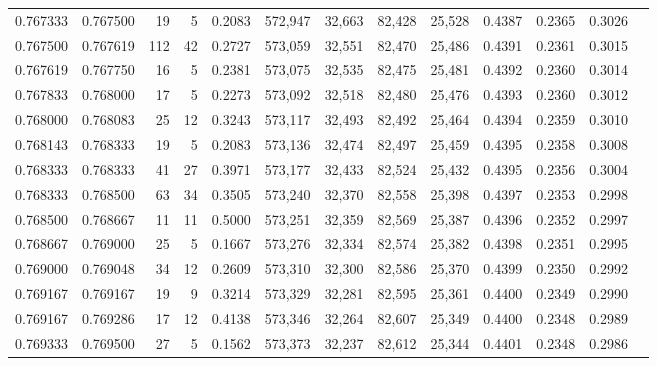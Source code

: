 \begin{tabular}{rrrrrrrrrrrrr}
0.767333 & 0.767500 &    19 &   5 &                                     0.2083 & 572,947 &  32,663 &  82,428 &  25,528 & 0.4387 & 0.2365 & 0.3026 \\
0.767500 & 0.767619 &   112 &  42 &                                     0.2727 & 573,059 &  32,551 &  82,470 &  25,486 & 0.4391 & 0.2361 & 0.3015 \\
0.767619 & 0.767750 &    16 &   5 &                                     0.2381 & 573,075 &  32,535 &  82,475 &  25,481 & 0.4392 & 0.2360 & 0.3014 \\
0.767833 & 0.768000 &    17 &   5 &                                     0.2273 & 573,092 &  32,518 &  82,480 &  25,476 & 0.4393 & 0.2360 & 0.3012 \\
0.768000 & 0.768083 &    25 &  12 &                                     0.3243 & 573,117 &  32,493 &  82,492 &  25,464 & 0.4394 & 0.2359 & 0.3010 \\
0.768143 & 0.768333 &    19 &   5 &                                     0.2083 & 573,136 &  32,474 &  82,497 &  25,459 & 0.4395 & 0.2358 & 0.3008 \\
0.768333 & 0.768333 &    41 &  27 &                                     0.3971 & 573,177 &  32,433 &  82,524 &  25,432 & 0.4395 & 0.2356 & 0.3004 \\
0.768333 & 0.768500 &    63 &  34 &                                     0.3505 & 573,240 &  32,370 &  82,558 &  25,398 & 0.4397 & 0.2353 & 0.2998 \\
0.768500 & 0.768667 &    11 &  11 &                                     0.5000 & 573,251 &  32,359 &  82,569 &  25,387 & 0.4396 & 0.2352 & 0.2997 \\
0.768667 & 0.769000 &    25 &   5 &                                     0.1667 & 573,276 &  32,334 &  82,574 &  25,382 & 0.4398 & 0.2351 & 0.2995 \\
0.769000 & 0.769048 &    34 &  12 &                                     0.2609 & 573,310 &  32,300 &  82,586 &  25,370 & 0.4399 & 0.2350 & 0.2992 \\
0.769167 & 0.769167 &    19 &   9 &                                     0.3214 & 573,329 &  32,281 &  82,595 &  25,361 & 0.4400 & 0.2349 & 0.2990 \\
0.769167 & 0.769286 &    17 &  12 &                                     0.4138 & 573,346 &  32,264 &  82,607 &  25,349 & 0.4400 & 0.2348 & 0.2989 \\
0.769333 & 0.769500 &    27 &   5 &                                     0.1562 & 573,373 &  32,237 &  82,612 &  25,344 & 0.4401 & 0.2348 & 0.2986 \\

\end{tabular}
